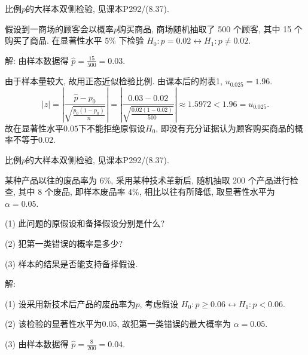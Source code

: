 \documentclass[standard]{ExBook}
\renewenvironment{shaded}{%
  \def\FrameCommand{\fboxsep=\FrameSep \colorbox{shadecolor}}%
  \MakeFramed{\advance\hsize-\width \FrameRestore}%
}{%
  \endMakeFramed
}
\begin{document}
\begin{qitems}
\textcolor{themeColor}{\selectfont {} 比例$p$的大样本双侧检验, 见课本P292/(8.37).}

\vspace{2.5cm-5em}

    \begin{bbox}
    \begin{shaded}
        \qitem
假设到一商场的顾客会以概率$p$购买商品, 商场随机抽取了 500 个顾客, 其中 15 个购买了商品. 在显著性水平 5\% 下检验 $H_0 : p=0.02 \longleftrightarrow H_1 : p \neq 0.02$.
    \end{shaded}
    \end{bbox}

\vspace{\dimexpr2.5cm-5em\relax}

解: 由样本数据得
$
\hat{p}=\frac{15}{500}=0.03
$.

由于样本量较大, 故用正态近似检验比例. 由课本后的附表1, $u_{0.025}=1.96$.
$$
|z|
=
\left|
\frac{\hat{p}-p_0}
{\sqrt{\frac{p_0(1-p_0)}{n}}}
\right|
=
\left|
\frac{0.03-0.02}
{\sqrt{\frac{0.02(1-0.02)}{500}}}
\right|
\approx1.5972
<
1.96
=
u_{0.025}.
$$
故在显著性水平$0.05$下不能拒绝原假设$H_0$, 即没有充分证据认为顾客购买商品的概率不等于$0.02$.

\textcolor{themeColor}{\selectfont {} 比例$p$的大样本双侧检验, 见课本P292/(8.37).}

\vspace{2.5cm-5em}

    \begin{bbox}
    \begin{shaded}
        \qitem
某种产品以往的废品率为 6\%, 采用某种技术革新后, 随机抽取 200 个产品进行检查, 其中 8 个废品, 即样本废品率 4\%, 相比以往有所降低, 取显著性水平为$\alpha=0.05$.

(1) 此问题的原假设和备择假设分别是什么?

(2) 犯第一类错误的概率是多少?

(3) 样本的结果是否能支持备择假设.
    \end{shaded}
    \end{bbox}

\vspace{\dimexpr2.5cm-5em\relax}

解:

(1) 设采用新技术后产品的废品率为$p$, 考虑假设
$
H_0:p\geq0.06
\longleftrightarrow
H_1:p<0.06
$.

(2) 该检验的显著性水平为$0.05$, 故犯第一类错误的最大概率为
$
\alpha=0.05
$.

(3) 由样本数据得
$
\hat{p}=\frac{8}{200}=0.04
$.


\end{qitems}
\end{document}

